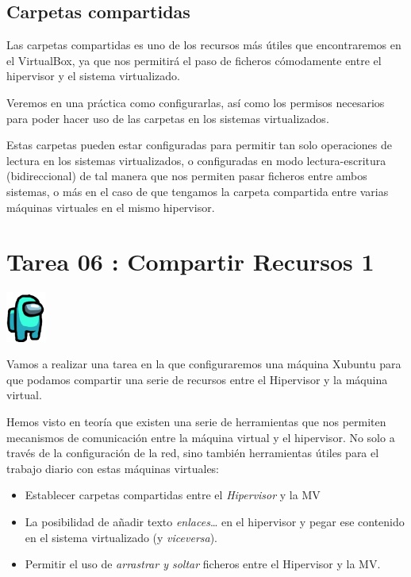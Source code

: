 \documentclass[11pt]{article}
\begin{document}
\subsection{Carpetas compartidas}
\label{sec:org64c5622}
Las carpetas compartidas es uno de los recursos más útiles que
encontraremos en el VirtualBox, ya que nos permitirá el paso de ficheros
cómodamente entre el hipervisor y el sistema virtualizado.

Veremos en una práctica como configurarlas, así como los permisos
necesarios para poder hacer uso de las carpetas en los sistemas
virtualizados.

Estas carpetas pueden estar configuradas para permitir tan solo
operaciones de lectura en los sistemas virtualizados, o configuradas en
modo lectura-escritura (bidireccional) de tal manera que nos permiten
pasar ficheros entre ambos sistemas, o más en el caso de que tengamos la
carpeta compartida entre varias máquinas virtuales en el mismo
hipervisor.


\newpage


\section{Tarea 06 : Compartir Recursos 1}
\label{sec:orgef2d342}

\begin{center}
\includegraphics[width=50px]{imgs/amongus.png}
\end{center}

Vamos a realizar una tarea en la que configuraremos una máquina Xubuntu
para que podamos compartir una serie de recursos entre el Hipervisor y
la máquina virtual.

Hemos visto en teoría que existen una serie de herramientas que nos
permiten mecanismos de comunicación entre la máquina virtual y el
hipervisor. No solo a través de la configuración de la red, sino también
herramientas útiles para el trabajo diario con estas máquinas virtuales:

\begin{itemize}
\item Establecer carpetas compartidas entre el \emph{Hipervisor} y la MV
\item La posibilidad de añadir texto \emph{enlaces}\ldots{} en el hipervisor y pegar
ese contenido en el sistema virtualizado (y \emph{viceversa}).
\item Permitir el uso de \emph{arrastrar y soltar} ficheros entre el Hipervisor y
la MV.
\end{itemize}
\end{document}
